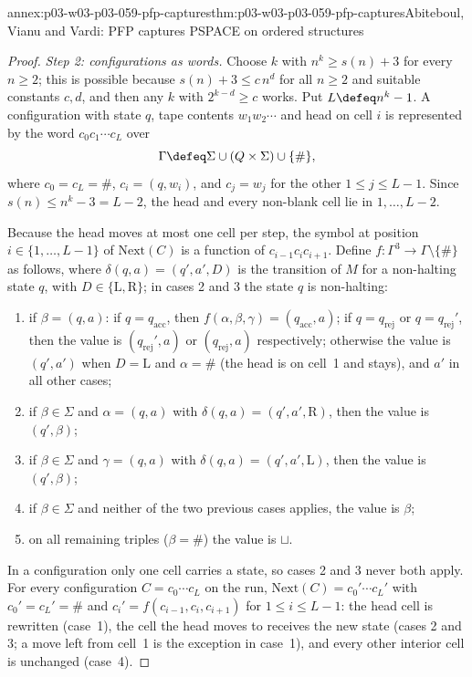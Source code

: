 \begin{annexitem}{annex:p03-w03-p03-059-pfp-captures}{thm:p03-w03-p03-059-pfp-captures}{Abiteboul, Vianu and Vardi: PFP captures PSPACE on ordered structures}
\begin{proof}
\emph{Step 2: configurations as words.} Choose \(k\) with
\(n^k\geq s(n)+3\) for every \(n\geq2\); this is possible because
\(s(n)+3\leq c\,n^d\) for all \(n\geq2\) and suitable constants \(c,d\),
and then any \(k\) with \(2^{k-d}\geq c\) works. Put \(L\defeq n^k-1\). A
configuration with state \(q\), tape contents \(w_1w_2\cdots\) and head on
cell \(i\) is represented by the word \(c_0c_1\cdots c_L\) over
\[
 \Gamma\defeq\Sigma\cup(Q\times\Sigma)\cup\{\#\},
\]
where \(c_0=c_L=\#\), \(c_i=(q,w_i)\), and \(c_j=w_j\) for the other
\(1\leq j\leq L-1\). Since \(s(n)\leq n^k-3=L-2\), the head and every
non-blank cell lie in \(1,\ldots,L-2\).

Because the head moves at most one cell per step, the symbol at position
\(i\in\{1,\ldots,L-1\}\) of \(\mathrm{Next}(C)\) is a function of
\(c_{i-1}c_ic_{i+1}\). Define \(f:\Gamma^3\to\Gamma\setminus\{\#\}\) as
follows, where \(\delta(q,a)=(q',a',D)\) is the transition of \(M\) for a
non-halting state \(q\), with \(D\in\{\mathrm L,\mathrm R\}\); in cases 2
and 3 the state \(q\) is non-halting:
\begin{enumerate}
 \item if \(\beta=(q,a)\): if \(q=q_{\mathrm{acc}}\), then
       \(f(\alpha,\beta,\gamma)=(q_{\mathrm{acc}},a)\); if
       \(q=q_{\mathrm{rej}}\) or \(q=q_{\mathrm{rej}}'\), then the value is
       \((q_{\mathrm{rej}}',a)\) or \((q_{\mathrm{rej}},a)\)
       respectively; otherwise the value is \((q',a')\) when
       \(D=\mathrm L\) and \(\alpha=\#\) (the head is on cell~1 and
       stays), and \(a'\) in all other cases;
 \item if \(\beta\in\Sigma\) and \(\alpha=(q,a)\) with
       \(\delta(q,a)=(q',a',\mathrm R)\), then the value is \((q',\beta)\);
 \item if \(\beta\in\Sigma\) and \(\gamma=(q,a)\) with
       \(\delta(q,a)=(q',a',\mathrm L)\), then the value is \((q',\beta)\);
 \item if \(\beta\in\Sigma\) and neither of the two previous cases
       applies, the value is \(\beta\);
 \item on all remaining triples (\(\beta=\#\)) the value is \(\sqcup\).
\end{enumerate}
In a configuration only one cell carries a state, so cases 2 and 3 never
both apply. For every configuration \(C=c_0\cdots c_L\) on the run,
\(\mathrm{Next}(C)=c_0'\cdots c_L'\) with \(c_0'=c_L'=\#\) and
\(c_i'=f(c_{i-1},c_i,c_{i+1})\) for \(1\leq i\leq L-1\): the head cell is
rewritten (case~1), the cell the head moves to receives the new state
(cases 2 and 3; a move left from cell~1 is the exception in case~1), and
every other interior cell is unchanged (case~4).


\end{proof}
\end{annexitem}
